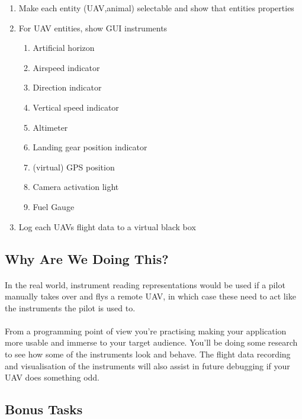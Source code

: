 \documentclass[11pt]{book}
\begin{document}
\begin{enumerate}
\item Make each entity (UAV,animal) selectable and show that entities properties
\item For UAV entities, show GUI instruments
    \begin{enumerate}
        \item Artificial horizon
        \item Airspeed indicator
        \item Direction indicator
        \item Vertical speed indicator
        \item Altimeter
        \item Landing gear position indicator
        \item (virtual) GPS position
        \item Camera activation light
        \item Fuel Gauge
    \end{enumerate}
\item Log each UAVs flight data to a virtual black box
\end{enumerate}

\subsection{Why Are We Doing This?}

\paragraph{} In the real world, instrument reading representations would be used if a pilot manually takes over and flys a remote UAV, in which case these need to act like the instruments the pilot is used to. 

\paragraph{} From a programming point of view you're practising making your application more usable and immerse to your target audience. You'll be doing some research to see how some of the instruments look and behave. The flight data recording and visualisation of the instruments will also assist in future debugging if your UAV does something odd.

\subsection{Bonus Tasks}
\end{document}
